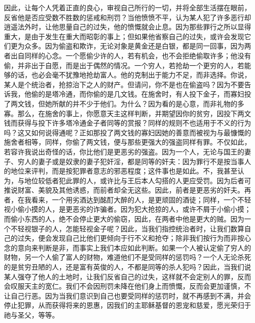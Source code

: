 因此，让每个人凭着正直的良心，审视自己所行的一切，并将全部生活摆在眼前，反省他是否应受数不胜数的惩戒和刑罚？当他愤愤不平，认为某人犯了许多恶行却逍遥法外时，让他思量自己的过失，他的愤慨就会止息。因为那些罪行之所以显得重大，是由于发生在重大而昭彰的事上；但如果他省察自己的过失，或许会发现它们更为众多。因为偷盗和欺诈，无论对象是黄金还是白银，都是同一回事，因为两者出自同样的心念。一个愿偷少许的人，若有机会，也不会拒绝偷取许多；他没有偷，并非出于自愿，而是出于偶然的情况。一个穷人，若抢劫一个更穷的人，若能够的话，也必会毫不犹豫地抢劫富人。他的克制出于能力不足，而非选择。你说，某人是个统治者，抢掠治下之人的财产。但请问，你不是也在偷盗吗？因为不要告诉我，他偷的是塔冷通，而你偷的是几文钱。在施舍时，有人投下金子，而寡妇投了两文钱，但她所献的并不少于他们。为什么？因为看的是心意，而非礼物的多寡。那么，在施舍的事上，你愿意天主这样判断，并期望因你的贫穷，因投下两文钱而获得与投下许多塔冷通金子者同等的赏报？同样的规则不也适用于不义的行为吗？这又如何说得通呢？正如那投了两文钱的寡妇因她的善意而被视为与最慷慨的施舍者相等，同样，你偷了两文钱，便与那些更强大的强盗同样有罪。不仅如此，若容许我说出奇怪的话，你比他们是更恶劣的强盗。因为一个人，无论与国王的妻子、穷人的妻子或是奴隶的妻子犯奸淫，都是同等的奸夫：因为罪行不是按当事人的地位来评判，而是按犯罪者意志的邪恶程度；这件事也是如此。不，我甚至认为，与地位较低者犯此罪的人，或许比与王后本人勾搭的人更应受罚。因为后者可推说财富、美貌及其他诱惑，而前者却全无这些。因此，前者是更恶劣的奸夫。再者，在我看来，一个用劣酒达到酩酊大醉的人，是更顽固的酒徒；同样，一个不轻视小偷小摸的人，是更恶劣的诈骗者。因为犯大抢掠的人，或许不屑于小偷小摸；而偷小东西的人，绝不会停止更大的偷窃，因此，在两者中他是更大的贼。因为一个不轻视银子的人，怎能轻视金子呢？因此，当我们指控统治者时，让我们数算自己的过失，便会发现自己比他们更倾向于行不义和抢夺；除非我们按行为而非按心念的意向来判断是非，而事实上我们本应如此判断。如果一个人被认定偷了穷人的财物，另一个人偷了富人的财物，难道他们不是受同样的惩罚吗？一个人无论杀死的是贫穷丑陋的人，还是富有英俊的人，不都是同等的杀人犯吗？因此，当我们说某人强夺了他人的土地时，让我们反省自己的过失，这样就不会定别人的罪，反而会叹服天主的宽仁。我们不会因刑罚未降在他们身上而愤慨，反而会更加谨慎，不让自己行恶。因为当我们意识到自己也要受同样的惩罚时，就不再感到不满，并会停止犯罪，从而获得将来的恩惠，因我们的主耶稣基督的恩宠和慈爱，愿光荣归于祂与圣父，等等。\par


